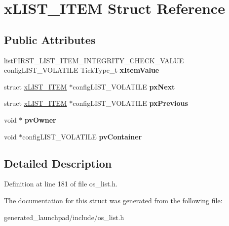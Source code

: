 \hypertarget{structxLIST__ITEM}{}\section{x\+L\+I\+S\+T\+\_\+\+I\+T\+EM Struct Reference}
\label{structxLIST__ITEM}
\subsection*{Public Attributes}
\begin{DoxyCompactItemize}
\item 
\mbox{\label{structxLIST__ITEM_a9b1f26de79f9da1403ca3ebc7a2e653a}} 
list\+F\+I\+R\+S\+T\+\_\+\+L\+I\+S\+T\+\_\+\+I\+T\+E\+M\+\_\+\+I\+N\+T\+E\+G\+R\+I\+T\+Y\+\_\+\+C\+H\+E\+C\+K\+\_\+\+V\+A\+L\+UE config\+L\+I\+S\+T\+\_\+\+V\+O\+L\+A\+T\+I\+LE Tick\+Type\+\_\+t {\bfseries x\+Item\+Value}
\item 
\mbox{\label{structxLIST__ITEM_a03713c4ee953ef5ca6adbec883720c60}} 
struct \mbox{\hyperlink{structxLIST__ITEM}{x\+L\+I\+S\+T\+\_\+\+I\+T\+EM}} $\ast$config\+L\+I\+S\+T\+\_\+\+V\+O\+L\+A\+T\+I\+LE {\bfseries px\+Next}
\item 
\mbox{\label{structxLIST__ITEM_ae8e553eae41010a8e41c66d76c94110b}} 
struct \mbox{\hyperlink{structxLIST__ITEM}{x\+L\+I\+S\+T\+\_\+\+I\+T\+EM}} $\ast$config\+L\+I\+S\+T\+\_\+\+V\+O\+L\+A\+T\+I\+LE {\bfseries px\+Previous}
\item 
\mbox{\label{structxLIST__ITEM_aeb3110b50fe0dbce826d929b27b5ddb1}} 
void $\ast$ {\bfseries pv\+Owner}
\item 
\mbox{\label{structxLIST__ITEM_a341462d06236aa07eaf1a864e4b59951}} 
void $\ast$config\+L\+I\+S\+T\+\_\+\+V\+O\+L\+A\+T\+I\+LE {\bfseries pv\+Container}
\end{DoxyCompactItemize}


\subsection{Detailed Description}


Definition at line 181 of file os\+\_\+list.\+h.



The documentation for this struct was generated from the following file\+:\begin{DoxyCompactItemize}
\item 
generated\+\_\+launchpad/include/os\+\_\+list.\+h\end{DoxyCompactItemize}
